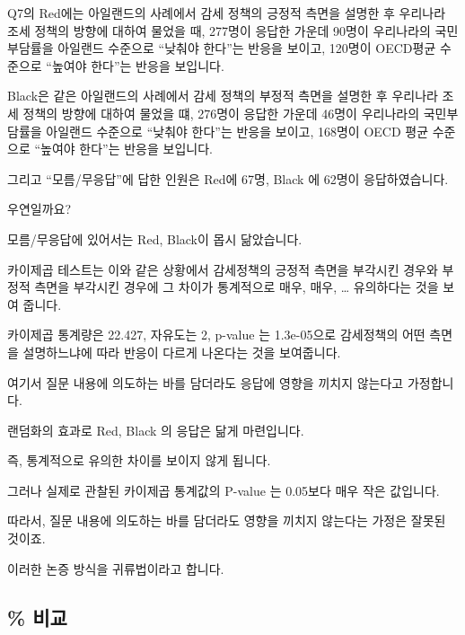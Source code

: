 \documentclass[
]{book}
\begin{document}
Q7의 Red에는 아일랜드의 사례에서 감세 정책의 긍정적 측면을 설명한 후 우리나라 조세 정책의 방향에 대하여 물었을 때, 277명이 응답한 가운데 90명이 우리나라의 국민부담률을 아일랜드 수준으로 ``낮춰야 한다''는 반응을 보이고, 120명이 OECD평균 수준으로 ``높여야 한다''는 반응을 보입니다.

Black은 같은 아일랜드의 사례에서 감세 정책의 부정적 측면을 설명한 후 우리나라 조세 정책의 방향에 대하여 물었을 떄, 276명이 응답한 가운데 46명이 우리나라의 국민부담률을 아일랜드 수준으로 ``낮춰야 한다''는 반응을 보이고, 168명이 OECD 평균 수준으로 ``높여야 한다''는 반응을 보입니다.

그리고 ``모름/무응답''에 답한 인원은 Red에 67명, Black 에 62명이 응답하였습니다.

우연일까요?

모름/무응답에 있어서는 Red, Black이 몹시 닮았습니다.

카이제곱 테스트는 이와 같은 상황에서 감세정책의 긍정적 측면을 부각시킨 경우와 부정적 측면을 부각시킨 경우에 그 차이가 통계적으로 매우, 매우, \ldots{} 유의하다는 것을 보여 줍니다.

카이제곱 통계량은 22.427, 자유도는 2, p-value 는 1.3e-05으로
감세정책의 어떤 측면을 설명하느냐에 따라 반응이 다르게 나온다는 것을 보여줍니다.

여기서 질문 내용에 의도하는 바를 담더라도 응답에 영향을 끼치지 않는다고 가정합니다.

랜덤화의 효과로 Red, Black 의 응답은 닮게 마련입니다.

즉, 통계적으로 유의한 차이를 보이지 않게 됩니다.

그러나 실제로 관찰된 카이제곱 통계값의 P-value 는 0.05보다 매우 작은 값입니다.

따라서, 질문 내용에 의도하는 바를 담더라도 영향을 끼치지 않는다는 가정은 잘못된 것이죠.

이러한 논증 방식을 귀류법이라고 합니다.

\subsection{\% 비교}\label{uxbe44uxad50-1}
\end{document}
